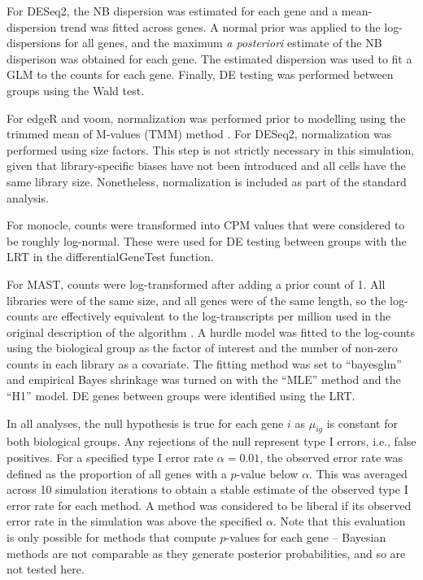 \documentclass{article}
\begin{document}
For DESeq2, the NB dispersion was estimated for each gene and a mean-dispersion trend was fitted across genes.
A normal prior was applied to the log-dispersions for all genes, and the maximum \textit{a posteriori} estimate of the NB disperison was obtained for each gene.
The estimated dispersion was used to fit a GLM to the counts for each gene.
Finally, DE testing was performed between groups using the Wald test.

For edgeR and voom, normalization was performed prior to modelling using the trimmed mean of M-values (TMM) method \cite{robinson2010scaling}.
For DESeq2, normalization was performed using size factors.
This step is not strictly necessary in this simulation, given that library-specific biases have not been introduced and all cells have the same library size.
Nonetheless, normalization is included as part of the standard analysis.

For monocle, counts were transformed into CPM values that were considered to be roughly log-normal.
These were used for DE testing between groups with the LRT in the differentialGeneTest function.

For MAST, counts were log-transformed after adding a prior count of 1.
All libraries were of the same size, and all genes were of the same length, 
    so the log-counts are effectively equivalent to the log-transcripts per million used in the original description of the algorithm \cite{finak2015mast}.
A hurdle model was fitted to the log-counts using the biological group as the factor of interest and the number of non-zero counts in each library as a covariate.
The fitting method was set to ``bayesglm'' and empirical Bayes shrinkage was turned on with the ``MLE'' method and the ``H1'' model.
DE genes between groups were identified using the LRT.

In all analyses, the null hypothesis is true for each gene $i$ as $\mu_{ig}$ is constant for both biological groups.
Any rejections of the null represent type I errors, i.e., false positives.
For a specified type I error rate $\alpha = 0.01$, the observed error rate was defined as the proportion of all genes with a $p$-value below $\alpha$.
This was averaged across 10 simulation iterations to obtain a stable estimate of the observed type I error rate for each method. 
A method was considered to be liberal if its observed error rate in the simulation was above the specified $\alpha$.
Note that this evaluation is only possible for methods that compute $p$-values for each gene -- 
    Bayesian methods \cite{vallejos2015basics,kharchenko2014bayesian} are not comparable as they generate posterior probabilities, and so are not tested here.
\end{document}
